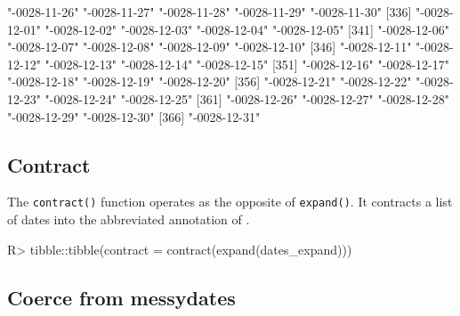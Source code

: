 \documentclass[
]{jss}
\begin{document}
\begin{CodeChunk}
\begin{CodeOutput}
[331] "-0028-11-26" "-0028-11-27" "-0028-11-28" "-0028-11-29" "-0028-11-30"
[336] "-0028-12-01" "-0028-12-02" "-0028-12-03" "-0028-12-04" "-0028-12-05"
[341] "-0028-12-06" "-0028-12-07" "-0028-12-08" "-0028-12-09" "-0028-12-10"
[346] "-0028-12-11" "-0028-12-12" "-0028-12-13" "-0028-12-14" "-0028-12-15"
[351] "-0028-12-16" "-0028-12-17" "-0028-12-18" "-0028-12-19" "-0028-12-20"
[356] "-0028-12-21" "-0028-12-22" "-0028-12-23" "-0028-12-24" "-0028-12-25"
[361] "-0028-12-26" "-0028-12-27" "-0028-12-28" "-0028-12-29" "-0028-12-30"
[366] "-0028-12-31"
\end{CodeOutput}
\end{CodeChunk}

\hypertarget{contract}{%
\subsection{Contract}\label{contract}}

The \texttt{contract()} function operates as the opposite of
\texttt{expand()}. It contracts a list of dates into the abbreviated
annotation of .

\begin{CodeChunk}
\begin{CodeInput}
R> tibble::tibble(contract = contract(expand(dates_expand)))
\end{CodeInput}
\begin{CodeOutput}
# A tibble: 7 x 1
  contract                                                                      
  <messydt>                                                                     
1 2008-03-25                                                                   ~
2 2001-01                                                                      ~
3 2001                                                                         ~
4 2001-01-01..2001-02-02                                                       ~
5 {2001-01-01,2001-02-02}                                                      ~
6 {2008-01-31,2008-02-28,2008-03-31,2008-04-30,2008-05-31,2008-06-30,2008-07-31~
7 -0028                                                                        ~
\end{CodeOutput}
\end{CodeChunk}

\hypertarget{coerce-from-messydates}{%
\subsection{Coerce from messydates}\label{coerce-from-messydates}}
\end{document}
